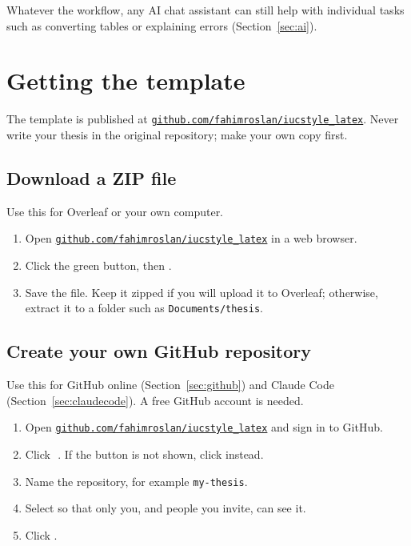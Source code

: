 \documentclass[11pt,a4paper]{article}
\newcommand\repourl{https://github.com/fahimroslan/iucstyle_latex}
\newcommand\repo{\href{\repourl}{\texttt{github.com/fahimroslan/iucstyle\_latex}}}
\newcommand\file[1]{\texttt{#1}}
\newcommand\then{\,\textrightarrow\,}
\begin{document}
Whatever the workflow, any AI chat assistant can still help with individual
tasks such as converting tables or explaining errors (Section~\ref{sec:ai}).

\section{Getting the template}\label{sec:get}

The template is published at \repo. Never write your thesis in the original
repository; make your own copy first.

\subsection{Download a ZIP file}

Use this for Overleaf or your own computer.
\begin{enumerate}
  \item Open \repo{} in a web browser.
  \item Click the green  button, then .
  \item Save the file. Keep it zipped if you will upload it to Overleaf;
        otherwise, extract it to a folder such as \file{Documents/thesis}.
\end{enumerate}

\subsection{Create your own GitHub repository}

Use this for GitHub online (Section~\ref{sec:github}) and Claude Code
(Section~\ref{sec:claudecode}). A free GitHub account is needed.
\begin{enumerate}
  \item Open \repo{} and sign in to GitHub.
  \item Click \then{}. If the
        button is not shown, click  instead.
  \item Name the repository, for example \file{my-thesis}.
  \item Select  so that only you, and people you invite, can see it.
  \item Click .
\end{enumerate}
\end{document}

